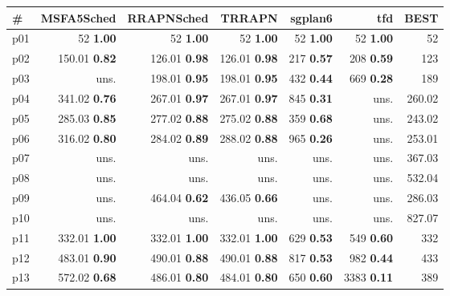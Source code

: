 \begin{tabular}{|l|rrrrr|r|}
\hline
\textbf{\#} & \textbf{MSFA5Sched} & \textbf{RRAPNSched} & \textbf{TRRAPN} & \textbf{sgplan6} & \textbf{tfd} & \textbf{BEST}\\
\hline
p01 & {\footnotesize 52} \textbf{1.00} & {\footnotesize 52} \textbf{1.00} & {\footnotesize 52} \textbf{1.00} & {\footnotesize 52} \textbf{1.00} & {\footnotesize 52} \textbf{1.00} & 52\\
p02 & {\footnotesize 150.01} \textbf{0.82} & {\footnotesize 126.01} \textbf{0.98} & {\footnotesize 126.01} \textbf{0.98} & {\footnotesize 217} \textbf{0.57} & {\footnotesize 208} \textbf{0.59} & 123\\
p03 & uns. & {\footnotesize 198.01} \textbf{0.95} & {\footnotesize 198.01} \textbf{0.95} & {\footnotesize 432} \textbf{0.44} & {\footnotesize 669} \textbf{0.28} & 189\\
p04 & {\footnotesize 341.02} \textbf{0.76} & {\footnotesize 267.01} \textbf{0.97} & {\footnotesize 267.01} \textbf{0.97} & {\footnotesize 845} \textbf{0.31} & uns. & 260.02\\
p05 & {\footnotesize 285.03} \textbf{0.85} & {\footnotesize 277.02} \textbf{0.88} & {\footnotesize 275.02} \textbf{0.88} & {\footnotesize 359} \textbf{0.68} & uns. & 243.02\\
p06 & {\footnotesize 316.02} \textbf{0.80} & {\footnotesize 284.02} \textbf{0.89} & {\footnotesize 288.02} \textbf{0.88} & {\footnotesize 965} \textbf{0.26} & uns. & 253.01\\
p07 & uns. & uns. & uns. & uns. & uns. & 367.03\\
p08 & uns. & uns. & uns. & uns. & uns. & 532.04\\
p09 & uns. & {\footnotesize 464.04} \textbf{0.62} & {\footnotesize 436.05} \textbf{0.66} & uns. & uns. & 286.03\\
p10 & uns. & uns. & uns. & uns. & uns. & 827.07\\
p11 & {\footnotesize 332.01} \textbf{1.00} & {\footnotesize 332.01} \textbf{1.00} & {\footnotesize 332.01} \textbf{1.00} & {\footnotesize 629} \textbf{0.53} & {\footnotesize 549} \textbf{0.60} & 332\\
p12 & {\footnotesize 483.01} \textbf{0.90} & {\footnotesize 490.01} \textbf{0.88} & {\footnotesize 490.01} \textbf{0.88} & {\footnotesize 817} \textbf{0.53} & {\footnotesize 982} \textbf{0.44} & 433\\
p13 & {\footnotesize 572.02} \textbf{0.68} & {\footnotesize 486.01} \textbf{0.80} & {\footnotesize 484.01} \textbf{0.80} & {\footnotesize 650} \textbf{0.60} & {\footnotesize 3383} \textbf{0.11} & 389\\

\end{tabular}
